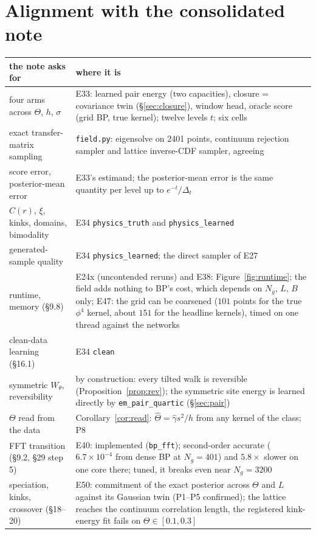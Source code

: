 \documentclass[10pt,a4paper]{article}
\newcommand{\Th}{\Theta}
\newcommand{\code}[1]{\texttt{\small #1}}
\theoremstyle{plain}
\theoremstyle{remark}
\begin{document}
\clearpage
\section{Alignment with the consolidated note}

\begin{table}[h]\centering\footnotesize
\begin{tabular}{@{}p{4.3cm} p{12.2cm}@{}}
\toprule
the note asks for & where it is \\
\midrule
four arms across $\Th$, $h$, $\sigma$ & E33: learned pair energy (two capacities), closure = covariance twin (\S\ref{sec:closure}), window head, oracle score (grid BP, true kernel); twelve levels $t$; six cells \\
exact transfer-matrix sampling & \code{field.py}: eigensolve on 2401 points, continuum rejection sampler and lattice inverse-CDF sampler, agreeing \\
score error, posterior-mean error & E33's estimand; the posterior-mean error is the same quantity per level up to $e^{-t}/\Delta_t$ \\
$C(r)$, $\xi$, kinks, domains, bimodality & E34 \code{physics\_truth} and \code{physics\_learned} \\
generated-sample quality & E34 \code{physics\_learned}; the direct sampler of E27 \\
runtime, memory (\S9.8) & E24x (uncontended reruns) and E38: Figure~\ref{fig:runtime}; the field adds nothing to BP's cost, which depends on $N_g$, $L$, $B$ only; E47: the grid can be coarsened ($101$ points for the true $\phi^4$ kernel, about $151$ for the headline kernels), timed on one thread against the networks \\
clean-data learning (\S16.1) & E34 \code{clean} \\
symmetric $W_\theta$, reversibility & by construction: every tilted walk is reversible (Proposition~\ref{prop:rev}); the symmetric site energy is learned directly by \code{em\_pair\_quartic} (\S\ref{sec:pair}) \\
$\Th$ read from the data & Corollary~\ref{cor:read}: $\hat\Th=\hat\gamma s^2/h$ from any kernel of the class; P8 \\
FFT transition (\S9.2, \S29 step 5) & E40: implemented (\code{bp\_fft}); second-order accurate ($6.7\times10^{-4}$ from dense BP at $N_g=401$) and $5.8\times$ slower on one core there; tuned, it breaks even near $N_g=3200$ \\
speciation, kinks, crossover (\S18--20) & E50: commitment of the exact posterior across $\Theta$ and $L$ against its Gaussian twin (P1--P5 confirmed); the lattice reaches the continuum correlation length, the registered kink-energy fit fails on $\Theta\in[0.1,0.3]$ \\

\end{tabular}
\end{table}
\end{document}
